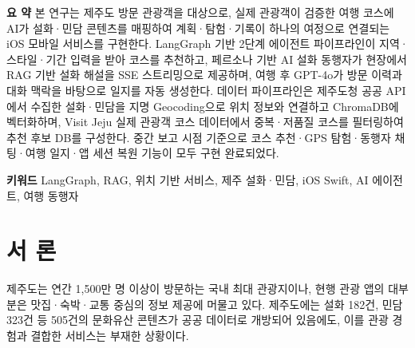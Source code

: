 \documentclass[10pt,twocolumn,a4paper]{article}
\begin{document}

{\small\noindent\textbf{요 약}\quad
본 연구는 제주도 방문 관광객을 대상으로, 실제 관광객이 검증한 여행 코스에
AI가 설화·민담 콘텐츠를 매핑하여 계획·탐험·기록이 하나의 여정으로 연결되는
iOS 모바일 서비스를 구현한다. LangGraph 기반 2단계 에이전트 파이프라인이
지역·스타일·기간 입력을 받아 코스를 추천하고, 페르소나 기반 AI 설화 동행자가
현장에서 RAG 기반 설화 해설을 SSE 스트리밍으로 제공하며, 여행 후 GPT-4o가
방문 이력과 대화 맥락을 바탕으로 일지를 자동 생성한다. 데이터 파이프라인은
제주도청 공공 API에서 수집한 설화·민담을 지명 Geocoding으로 위치 정보와
연결하고 ChromaDB에 벡터화하며, Visit Jeju 실제 관광객 코스 데이터에서
중복·저품질 코스를 필터링하여 추천 후보 DB를 구성한다. 중간 보고 시점
기준으로 코스 추천·GPS 탐험·동행자 채팅·여행 일지·앱 세션 복원 기능이
모두 구현 완료되었다.}

\vspace{6pt}
{\small\noindent\textbf{키워드}\quad
LangGraph, RAG, 위치 기반 서비스, 제주 설화·민담, iOS Swift, AI 에이전트,
여행 동행자}

\vspace{8pt}

\section{서 론}

제주도는 연간 1,500만 명 이상이 방문하는 국내 최대 관광지이나, 현행 관광
앱의 대부분은 맛집·숙박·교통 중심의 정보 제공에 머물고 있다. 제주도에는
설화 182건, 민담 323건 등 505건의 문화유산 콘텐츠가 공공 데이터로 개방되어
있음에도, 이를 관광 경험과 결합한 서비스는 부재한 상황이다.
\end{document}
